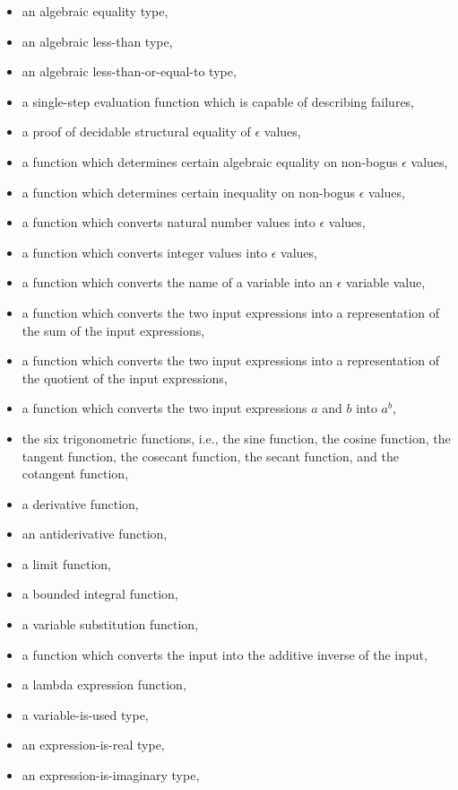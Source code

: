 \documentclass{report}
\begin{document}
\begin{itemize}
  \item an algebraic equality type,
  \item an algebraic less-than type,
  \item an algebraic less-than-or-equal-to type,
  \item a single-step evaluation function which is capable of describing failures,
  \item a proof of decidable structural equality of \(\epsilon\) values,
  \item a function which determines certain algebraic equality on non-bogus \(\epsilon\) values,
  \item a function which determines certain inequality on non-bogus \(\epsilon\) values,
  \item a function which converts natural number values into \(\epsilon\) values,
  \item a function which converts integer values into \(\epsilon\) values,
  \item a function which converts the name of a variable into an \(\epsilon\) variable value,
  \item a function which converts the two input expressions into a representation of the sum of the input expressions,
  \item a function which converts the two input expressions into a representation of the quotient of the input expressions,
  \item a function which converts the two input expressions \(a\) and \(b\) into \(a^b\),
  \item the six trigonometric functions, i.e., the sine function, the cosine function, the tangent function, the cosecant function, the secant function, and the cotangent function,
  \item a derivative function,
  \item an antiderivative function,
  \item a limit function,
  \item a bounded integral function,
  \item a variable substitution function,
  \item a function which converts the input into the additive inverse of the input,
  \item a lambda expression function,
  \item a variable-is-used type,
  \item an expression-is-real type,
  \item an expression-is-imaginary type,

\end{itemize}
\end{document}
